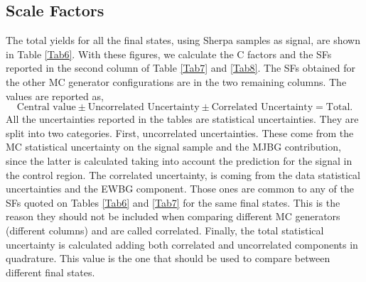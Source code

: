 \subsection{Scale Factors}
The total yields for all the final states, using Sherpa samples as signal, are shown in Table \ref{Tab6}. With these figures, we calculate the C factors and the SFs reported in the second column of Table \ref{Tab7} and \ref{Tab8}. The SFs obtained for the other MC generator configurations are in the two remaining columns. The values are reported as,
\begin{equation}
	\text{Central value}\pm\text{Uncorrelated Uncertainty}\pm\text{Correlated Uncertainty}=\text{Total}.
	\label{equncer}
\end{equation}
All the uncertainties reported in the tables are statistical uncertainties. They are split into two categories. First, uncorrelated uncertainties. These come from the MC statistical uncertainty on the signal sample and the MJBG contribution, since the latter is calculated taking into account the prediction for the signal in the control region. The correlated uncertainty, is coming from the data statistical uncertainties and the EWBG component. Those ones are common to any of the SFs quoted on Tables \ref{Tab6} and \ref{Tab7} for the same final states. This is the reason they should not be included when comparing different MC generators (different columns) and are called correlated. Finally, the total statistical uncertainty is calculated adding both correlated and uncorrelated components in quadrature. This value is the one that should be used to compare between different final states.

